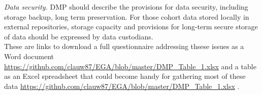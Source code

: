\documentclass{article}
\begin{document}
\textit{Data security.} DMP should describe the provisions for data security, including storage backup, long term preservation. For those cohort data stored locally in external repositories, storage capacity and provisions for long-term secure storage of data should be expressed by data custodians.\\





These are links to download a full questionnaire addressing thsese issues as a Word document \url{https://github.com/clauw87/EGA/blob/master/DMP_Table_1.xlsx} and a table as an Excel spreadsheet that could become handy for gathering most of these data \url{https://github.com/clauw87/EGA/blob/master/DMP_Table_1.xlsx} . \\
\end{document}
